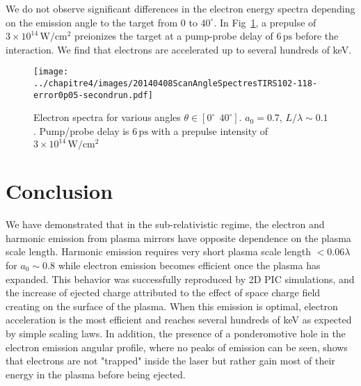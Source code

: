\noindent {}

\noindent We do not observe significant differences in the electron energy spectra depending on the emission angle to the target from $0$ to $40^{\circ}$. In Fig~\ref{fig:20140408ScanAngleSpectresTIRS102-118-error0p05-secondrun}, a prepulse of $3\times 10^{14}\,\mathrm{W/cm^2}$ preionizes the target at a pump-probe delay of $6\,\mathrm{ps}$ before the interaction. We find that electrons are accelerated up to several hundreds of keV. 

\begin{figure}[H]
\centering
\texttt{[image: ../chapitre4/images/20140408ScanAngleSpectresTIRS102-118-error0p05-secondrun.pdf]}\\
\caption{\label{fig:20140408ScanAngleSpectresTIRS102-118-error0p05-secondrun} Electron spectra for various angles $\theta \in [0^{\circ} \ \ 40^{\circ}]$. $a_0 = 0.7$, $L/\lambda \sim 0.1$. Pump/probe delay is $6\,\mathrm{ps}$ with a prepulse intensity of $3\times 10^{14}\,\mathrm{W/cm^2}$  }
\end{figure}





\section{Conclusion}

We have demonstrated that in the sub-relativistic regime, the electron and harmonic emission from plasma mirrors have opposite dependence on the plasma scale length. Harmonic emission requires very short plasma scale length $<0.06\lambda$ for $a_0\sim 0.8$ while electron emission becomes efficient once the plasma has expanded. This behavior was successfully reproduced by 2D PIC simulations, and the increase of ejected charge attributed to the effect of space charge field creating on the surface of the plasma. When this emission is optimal, electron acceleration is the most efficient and reaches several hundreds of keV as expected by simple scaling laws. In addition, the presence of a ponderomotive hole in the electron emission angular profile, where no peaks of emission can be seen, shows that electrons are not "trapped" inside the laser but rather gain most of their energy in the plasma before being ejected.











